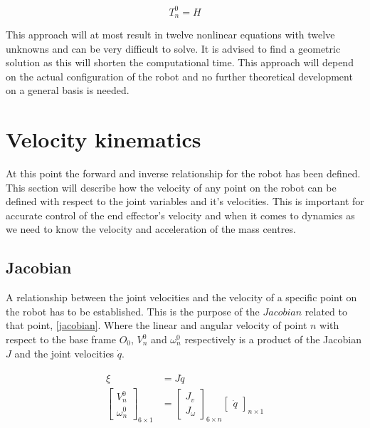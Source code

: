 \begin{equation}\label{inverse_kin}
T^0_n = H
\end{equation}

This approach will at most result in twelve nonlinear equations with twelve unknowns and can be very difficult to solve. It is advised to find a geometric solution as this will shorten the computational  time. This approach will depend on the actual configuration of the robot and no further theoretical development on a general basis is needed.

\section{Velocity kinematics}
At this point the forward and inverse relationship for the robot has been defined. This section will describe how the velocity of any point on the robot can be defined with respect to the joint variables and it's velocities. This is important for accurate control of the end effector's velocity and when it comes to 
dynamics as we need to know the velocity and acceleration of the mass centres.
\subsection{Jacobian}


A relationship between the joint velocities and the velocity of a specific point on the robot has to be established. This is the purpose of the $Jacobian$ related to that point, \eqref{jacobian}. Where the linear and angular velocity of point $n$ with respect to the base frame $O_0$, $V^0_n$ and $\omega^0_n$ respectively is a product of the Jacobian $J$ and the joint velocities $\dot{q}$. 

\begin{align}\label{jacobian}
\begin{split}
\xi &= J\dot{q}\\
\begin{bmatrix}
V^0_n\\ 
\omega^0_n
\end{bmatrix}_{6\times 1}
&=
\begin{bmatrix}
J_v\\ 
J_\omega
\end{bmatrix}_{6\times n} \begin{bmatrix}
\dot{q}
\end{bmatrix}_{n\times 1}
\end{split}
\end{align}


